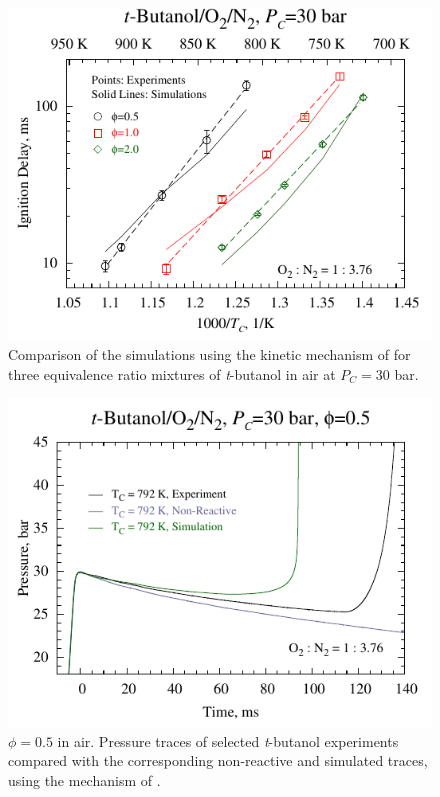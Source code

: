 \documentclass[12pt, letterpaper]{article}
\begin{document}
\begin{figure}
    \centering
    \includegraphics[width=12cm]{03-Butanol/tbuoh-sims}
    \caption{Comparison of the simulations using the kinetic mechanism of
        \textcite{Sarathy2012} for three equivalence ratio mixtures of
        \textit{t}-butanol in air at $P_C=30$ bar.}
    \label{fig:tbuoh-sims}
\end{figure}

\begin{figure}
    \centering
    \includegraphics[width=12cm]{03-Butanol/tbuoh-05press}
    \caption{$\phi=0.5$ in air. Pressure traces of selected
        \textit{t}-butanol experiments compared with the corresponding
        non-reactive and simulated traces, using the mechanism of
        \textcite{Sarathy2012}.}
    \label{fig:tbuoh-05press}
\end{figure}
\end{document}
